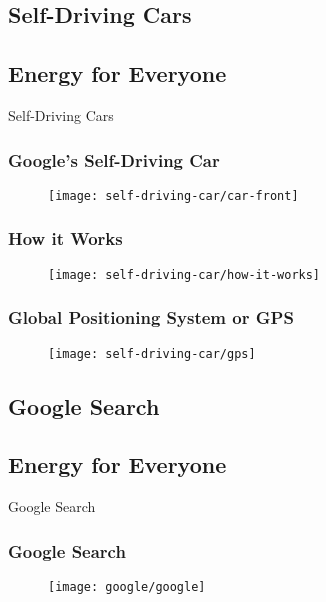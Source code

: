 \documentclass{beamer}
\begin{document}
\subsection{Self-Driving Cars}
\subsection{Energy for Everyone}
\begin{frame}[plain,c]
\begin{center}
\Huge Self-Driving Cars
\end{center}
\end{frame}


\begin{frame}
  \frametitle{Google's Self-Driving Car}
  \begin{figure}
  \centering
  \texttt{[image: self-driving-car/car-front]}
  \end{figure}
\end{frame}

\begin{frame}
  \frametitle{How it Works}
  \begin{figure}
  \centering
  \texttt{[image: self-driving-car/how-it-works]}
  \end{figure}
\end{frame}

\begin{frame}
  \frametitle{Global Positioning System or GPS}
  \begin{figure}
  \centering
  \texttt{[image: self-driving-car/gps]}
  \end{figure}
\end{frame}


\subsection{Google Search}
\subsection{Energy for Everyone}
\begin{frame}[plain,c]
\begin{center}
\Huge Google Search
\end{center}
\end{frame}


\begin{frame}
  \frametitle{Google Search}
  \begin{figure}
  \centering
  \texttt{[image: google/google]}
  \end{figure}
\end{frame}
\end{document}
